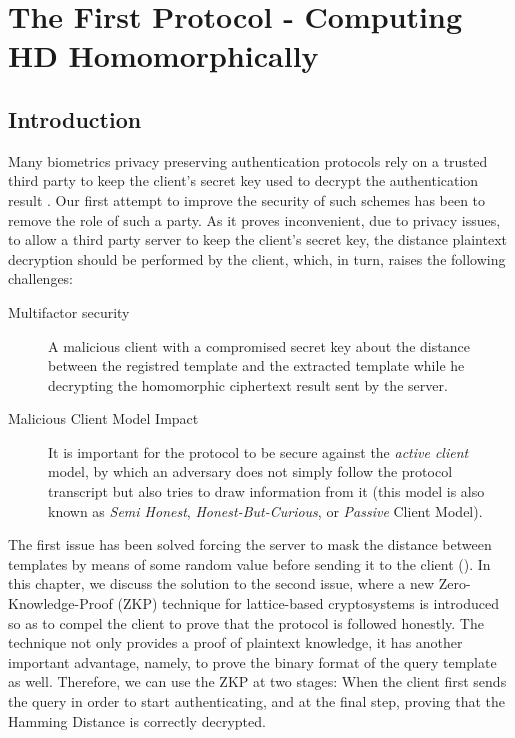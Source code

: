 \chapter{The First Protocol - Computing HD Homomorphically}
\label{chap:firstProtocol}

\ifpdf
    \graphicspath{{Chapter3/Figs/Raster/}{Chapter3/Figs/PDF/}{Chapter3/Figs/}}
\else
    \graphicspath{{Chapter3/Figs/Vector/}{Chapter3/Figs/}}
\fi

\section{Introduction}
\label{sec:firstProcIntro}
Many biometrics privacy preserving authentication protocols rely on a trusted
third party to keep the client's secret key used to decrypt the authentication
result \missref{}. Our first attempt to improve the security of such schemes has
been to remove the role of such a party. As it proves inconvenient, due to
privacy issues, to allow a third party server to keep the client's secret key, the
distance plaintext decryption should be performed by the client, which, in turn,
raises the following challenges:
\begin{description}
\item[Multifactor security] A malicious client with a compromised secret key
  about the distance between the registred template and the extracted template while he decrypting the homomorphic ciphertext result sent by the server.
\item[Malicious Client Model Impact] It is important for the protocol to be secure
  against the \textit{active client }model, by which an adversary does not simply follow the
  protocol transcript but also tries to draw information from it (this model is also known
  as \textit{Semi Honest}, \textit{Honest-But-Curious}, or \textit{Passive} Client Model). 
\end{description}

The first issue has been solved forcing the server to mask the distance between templates by means of some
random value before sending it to the client
(\cite{mandal2015comprehensive}). In this chapter, we discuss the solution to
the second issue, where a new Zero-Knowledge-Proof (ZKP) technique for
lattice-based cryptosystems is introduced so as to compel the client to prove that the protocol is followed honestly. The technique not only provides a
proof of plaintext knowledge, it has another important advantage, namely, to prove the
binary format of the query template as well. Therefore, we can use the ZKP at
two stages: When the client first sends the query in order to start authenticating,
and at the final step, proving that the Hamming Distance is correctly decrypted.


